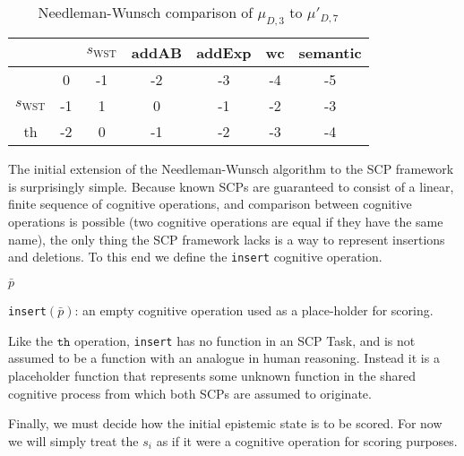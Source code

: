 \begin{table}
\begin{center}
\begin{tabular}{c | c c c c c c }
 & & $s_\text{WST}$ & addAB & addExp & wc & semantic\\
\hline
 & 0 & -1 & -2 & -3 & -4 & -5\\
$s_\text{WST}$ & -1 & 1 & 0 & -1 & -2 & -3\\
th & -2 & 0 & -1 & -2 & -3 & -4
\end{tabular}
\caption{Needleman-Wunsch comparison of $\mu_{D,3}$ to $\mu'_{D,7}$}
\label{tbl:compD3D7prime}
\end{center}
\end{table}

The initial extension of the Needleman-Wunsch algorithm to the SCP framework is surprisingly simple. Because known SCPs are guaranteed to consist of a linear, finite sequence of cognitive operations, and comparison between cognitive operations is possible (two cognitive operations are equal if they have the same name), the only thing the SCP framework lacks is a way to represent insertions and deletions. To this end we define the \texttt{insert} cognitive operation. 

\begin{algorithm}[H] \label{cogOp:insert}
\SetAlgoLined
{}
{
\Return $\bar{p}$
}

\caption{\texttt{insert}$(\bar{p})$: an empty cognitive operation used as a place-holder for scoring.}
\end{algorithm}

Like the $\texttt{th}$ operation, \texttt{insert} has no function in an SCP Task, and is not assumed to be a function with an analogue in human reasoning. Instead it is a placeholder function that represents some unknown function in the shared cognitive process from which both SCPs are assumed to originate.

Finally, we must decide how the initial epistemic state is to be scored. For now we will simply treat the $s_i$ as if it were a cognitive operation for scoring purposes.

